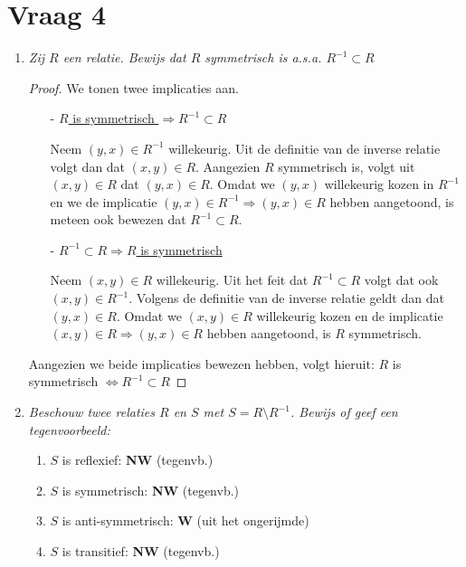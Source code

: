 \documentclass[kulak]{kulakarticle} %
\begin{document}
	\section*{Vraag 4}

	\begin{enumerate}
		\item \textit{Zij \(R\) een relatie. Bewijs dat \(R\) symmetrisch is a.s.a. \(R^{-1}\subset R\)}

		\begin{proof}
			We tonen twee implicaties aan.

			\begin{itemize}
				\item[-] \underline{\(R\) is symmetrisch \(\Rightarrow R^{-1}\subset R\)}

				Neem \((y,x)\in R^{-1}\) willekeurig. Uit de definitie van de inverse relatie volgt dan dat \((x,y)\in R\). Aangezien \(R\) symmetrisch is, volgt uit \((x,y)\in R\) dat \((y,x)\in R\). Omdat we \((y,x)\) willekeurig kozen in \(R^{-1}\) en we de implicatie \((y,x)\in R^{-1}\Rightarrow (y,x)\in R\) hebben aangetoond, is meteen ook bewezen dat \(R^{-1}\subset R\).

				\item[-] \underline{\( R^{-1}\subset R \Rightarrow R\) is symmetrisch}


				Neem \((x,y)\in R\) willekeurig. Uit het feit dat \(R^{-1}\subset R\) volgt dat ook \((x,y)\in R^{-1}\). Volgens de definitie van de inverse relatie geldt dan dat \((y,x)\in R\). Omdat we \((x,y) \in R\) willekeurig kozen en de implicatie \((x,y)\in R \Rightarrow (y,x)\in R\) hebben aangetoond, is \(R\) symmetrisch.

			\end{itemize}

			Aangezien we beide implicaties bewezen hebben, volgt hieruit: \(R\) is symmetrisch \(\Leftrightarrow R^{-1}\subset R\)
		\end{proof}

		\item \textit{Beschouw twee relaties \(R\) en \(S\) met \(S=R\setminus R^{-1}\). Bewijs of geef een tegenvoorbeeld:}
		\begin{enumerate}
			\item \(S\) is reflexief: \textbf{NW} (tegenvb.)
			\item \(S\) is symmetrisch: \textbf{NW} (tegenvb.)
			\item \(S\) is anti-symmetrisch: \textbf{W} (uit het ongerijmde)
			\item \(S\) is transitief: \textbf{NW} (tegenvb.)
		\end{enumerate}
	\end{enumerate}
\end{document}
